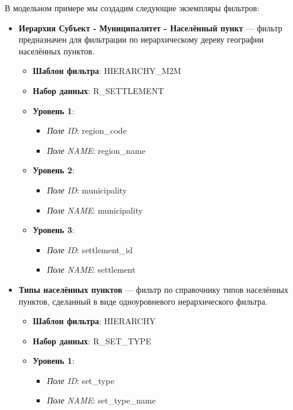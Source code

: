 \documentclass[../user-manual.tex]{subfiles}
\begin{document}
	\begin{modelExample}
		 
			В модельном примере мы создадим следующие экземпляры фильтров:
		
		\begin{itemize}
			\item \textbf{Иерархия Субъект - Муниципалитет - Населённый пункт} --- фильтр предназначен для фильтрации по иерархическому дереву географии населённых пунктов.
			
				\begin{itemize}
					\item \textbf{Шаблон фильтра}: HIERARCHY\_M2M
					\item \textbf{Набор данных}: R\_SETTLEMENT
					\item \textbf{Уровень 1}:
						\begin{itemize}
							\item \textit{Поле ID}: region\_code
							\item \textit{Поле NAME}: region\_name
						\end{itemize}
					\item \textbf{Уровень 2}:
					\begin{itemize}
						\item \textit{Поле ID}: municipality
						\item \textit{Поле NAME}: municipality
					\end{itemize}
					\item \textbf{Уровень 3}:
					\begin{itemize}
						\item \textit{Поле ID}: settlement\_id
						\item \textit{Поле NAME}: settlement
					\end{itemize}
				\end{itemize}
		\end{itemize}
		
		\begin{itemize}
			\item \textbf{Типы населённых пунктов} --- фильтр по справочнику типов населённых пунктов, сделанный в виде одноуровневого иерархического фильтра.
			
				\begin{itemize}
				\item \textbf{Шаблон фильтра}: HIERARCHY
				\item \textbf{Набор данных}: R\_SET\_TYPE
				\item \textbf{Уровень 1}:
					\begin{itemize}
						\item \textit{Поле ID}: set\_type
						\item \textit{Поле NAME}: set\_type\_name
					\end{itemize}
				

\end{itemize}
\end{itemize}
\end{modelExample}
\end{document}
